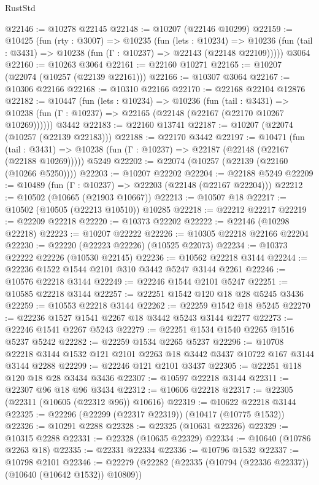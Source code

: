 \begin{lexlean}{RustStd}
\begin{coremodule}
@22146 := @10278 @22145
@22148 := @10207 (@22146 @10299)
@22159 := @10425
    (fun (rty : @3007) =>
    @10235
      (fun (lets : @10234) =>
      @10236 (fun (tail : @3431) => @10238 (fun (Γ : @10237) => @22143 (@22148 @22109)))))
    @3064
@22160 := @10263 @3064
@22161 := @22160 @10271
@22165 := @10207 (@22074 (@10257 (@22139 @22161)))
@22166 := @10307 @3064
@22167 := @10306 @22166
@22168 := @10310 @22166
@22170 := @22168 @22104 @12876
@22182 := @10447
    (fun (lets : @10234) =>
    @10236
      (fun (tail : @3431) =>
      @10238 (fun (Γ : @10237) => @22165 (@22148 (@22167 (@22170 @10267 @10269))))))
    @3442
@22183 := @22160 @13741
@22187 := @10207 (@22074 (@10257 (@22139 @22183)))
@22188 := @22170 @3442
@22197 := @10471
    (fun (tail : @3431) => @10238 (fun (Γ : @10237) => @22187 (@22148 (@22167 (@22188 @10269)))))
    @5249
@22202 := @22074 (@10257 (@22139 (@22160 (@10266 @5250))))
@22203 := @10207 @22202
@22204 := @22188 @5249
@22209 := @10489 (fun (Γ : @10237) => @22203 (@22148 (@22167 @22204)))
@22212 := @10502 (@10665 (@21903 @10667))
@22213 := @10507 @18
@22217 := @10502 (@10505 (@22213 @10510)) @10285
@22218 := @22212 @22217
@22219 := @22209 @22218
@22220 := @10373 @22202
@22222 := @22146 (@10298 @22218)
@22223 := @10207 @22222
@22226 := @10305 @22218 @22166 @22204
@22230 := @22220 (@22223 @22226) (@10525 @22073)
@22234 := @10373 @22222 @22226 (@10530 @22145)
@22236 := @10562 @22218 @3144
@22244 := @22236 @1522 @1544 @2101 @310 @3442 @5247 @3144 @2261
@22246 := @10576 @22218 @3144
@22249 := @22246 @1544 @2101 @5247
@22251 := @10585 @22218 @3144
@22257 := @22251 @1542 @120 @18 @28 @5245 @3436
@22259 := @10553 @22218 @3144
@22262 := @22259 @1542 @18 @5245
@22270 := @22236 @1527 @1541 @2267 @18 @3442 @5243 @3144 @2277
@22273 := @22246 @1541 @2267 @5243
@22279 := @22251 @1534 @1540 @2265 @1516 @5237 @5242
@22282 := @22259 @1534 @2265 @5237
@22296 := @10708 @22218 @3144 @1532 @121 @2101 @2263 @18 @3442 @3437 @10722 @167 @3144 @3144 @2288
@22299 := @22246 @121 @2101 @3437
@22305 := @22251 @118 @120 @18 @28 @3434 @3436
@22307 := @10597 @22218 @3144
@22311 := @22307 @96 @18 @96 @3434
@22312 := @10606 @22218
@22317 := @22305 (@22311 (@10605 (@22312 @96)) @10616)
@22319 := @10622 @22218 @3144
@22325 := @22296 (@22299 (@22317 @22319)) (@10417 (@10775 @1532))
@22326 := @10291 @2288
@22328 := @22325 (@10631 @22326)
@22329 := @10315 @2288
@22331 := @22328 (@10635 @22329)
@22334 := @10640 (@10786 @2263 @18)
@22335 := @22331 @22334
@22336 := @10796 @1532
@22337 := @10798 @2101
@22346 := @22279 (@22282 (@22335 (@10794 (@22336 @22337)) (@10640 (@10642 @1532)) @10809))

\end{coremodule}
\end{lexlean}
